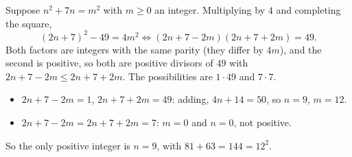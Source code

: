 Suppose $n^2+7n=m^2$ with $m\ge0$ an integer. Multiplying by $4$ and completing the square,
\[(2n+7)^2-49=4m^2\iff(2n+7-2m)(2n+7+2m)=49.\]
Both factors are integers with the same parity (they differ by $4m$), and the second is positive, so both are positive divisors of $49$ with $2n+7-2m\le2n+7+2m$. The possibilities are $1\cdot49$ and $7\cdot7$.
\begin{itemize}
\item $2n+7-2m=1$, $2n+7+2m=49$: adding, $4n+14=50$, so $n=9$, $m=12$.
\item $2n+7-2m=2n+7+2m=7$: $m=0$ and $n=0$, not positive.
\end{itemize}
So the only positive integer is $n=\boxed{9}$, with $81+63=144=12^2$.
